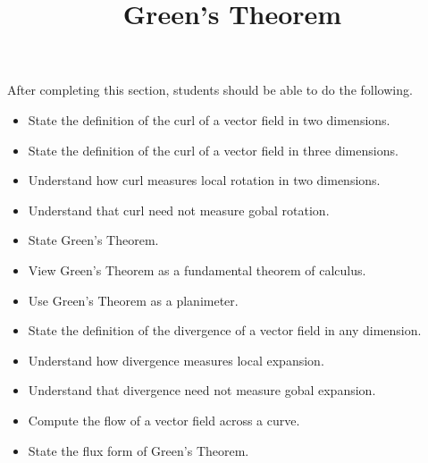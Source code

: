\documentclass{ximera}
\title{Green's Theorem}
\begin{document}
\begin{abstract}
\end{abstract}
\maketitle

\begin{sectionOutcomes}

After completing this section, students should be able to do the following.

\begin{itemize}
\item State the definition of the curl of a vector field in two dimensions.
\item State the definition of the curl of a vector field in three dimensions.
\item Understand how curl measures local rotation in two dimensions.
\item Understand that curl need not measure gobal rotation.
\item State Green's Theorem.
\item View Green's Theorem as a fundamental theorem of calculus.
\item Use Green's Theorem as a planimeter.
\item State the definition of the divergence of a vector field in any dimension.
\item Understand how divergence measures local expansion.
\item Understand that divergence need not measure gobal expansion.
\item Compute the flow of a vector field across a curve.
\item State the flux form of Green's Theorem.
\end{itemize}

\end{sectionOutcomes}
\end{document}
